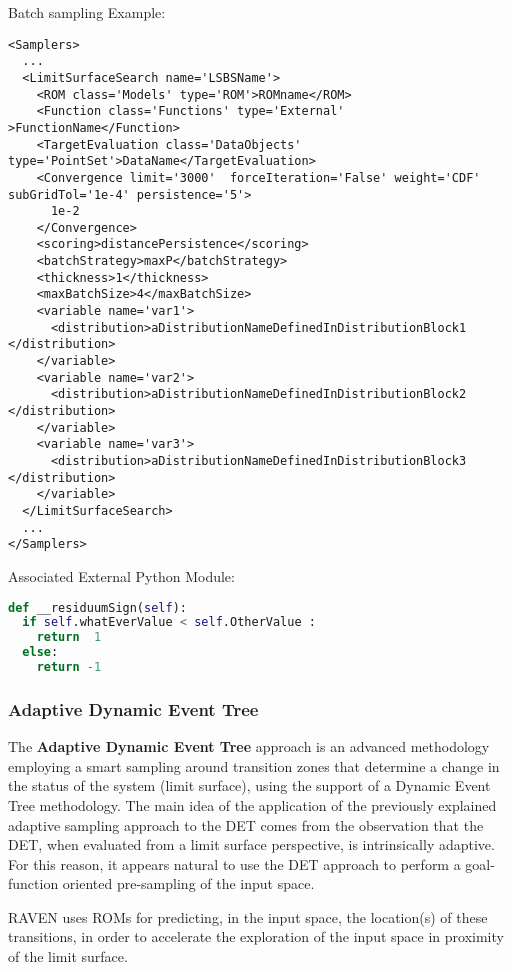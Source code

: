 Batch sampling Example:
\begin{lstlisting}[style=XML,morekeywords={class,limit,subGridTol,weight,persistence}]
<Samplers>
  ...
  <LimitSurfaceSearch name='LSBSName'>
    <ROM class='Models' type='ROM'>ROMname</ROM>
    <Function class='Functions' type='External' >FunctionName</Function>
    <TargetEvaluation class='DataObjects' type='PointSet'>DataName</TargetEvaluation>
    <Convergence limit='3000'  forceIteration='False' weight='CDF'  subGridTol='1e-4' persistence='5'>
      1e-2
    </Convergence>
    <scoring>distancePersistence</scoring>
    <batchStrategy>maxP</batchStrategy>
    <thickness>1</thickness>
    <maxBatchSize>4</maxBatchSize>
    <variable name='var1'>
      <distribution>aDistributionNameDefinedInDistributionBlock1 </distribution>
    </variable>
    <variable name='var2'>
      <distribution>aDistributionNameDefinedInDistributionBlock2 </distribution>
    </variable>
    <variable name='var3'>
      <distribution>aDistributionNameDefinedInDistributionBlock3 </distribution>
    </variable>
  </LimitSurfaceSearch>
  ...
</Samplers>
\end{lstlisting}

Associated External Python Module:
\begin{lstlisting}[language=python]
def __residuumSign(self):
  if self.whatEverValue < self.OtherValue :
    return  1
  else:
    return -1
\end{lstlisting}

\subsubsection{Adaptive Dynamic Event Tree}
\label{subsubsubsec:ADET}
The \textbf{Adaptive Dynamic Event Tree} approach is an advanced methodology
employing a smart sampling around transition zones that determine a change in
the status of the system (limit surface), using the support of a Dynamic Event
Tree methodology.
%
The main idea of the application of the previously explained adaptive sampling
approach to the DET comes from the observation that the DET, when evaluated from
a limit surface perspective, is intrinsically adaptive.
%
For this reason, it appears natural to use the DET approach to perform a
goal-function oriented pre-sampling of the input space.

RAVEN uses ROMs for predicting, in the input space,
the location(s) of these transitions, in order to accelerate the exploration of
the input space in proximity of the limit surface.

